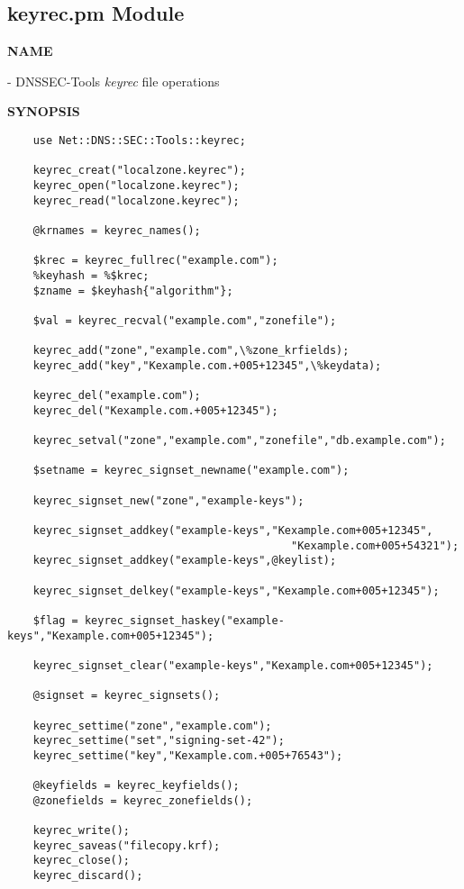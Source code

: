 \clearpage

\subsection{\bf keyrec.pm Module}

{\bf NAME}

 - DNSSEC-Tools {\it keyrec} file operations

{\bf SYNOPSIS}

\begin{verbatim}
    use Net::DNS::SEC::Tools::keyrec;

    keyrec_creat("localzone.keyrec");
    keyrec_open("localzone.keyrec");
    keyrec_read("localzone.keyrec");

    @krnames = keyrec_names();

    $krec = keyrec_fullrec("example.com");
    %keyhash = %$krec;
    $zname = $keyhash{"algorithm"};

    $val = keyrec_recval("example.com","zonefile");

    keyrec_add("zone","example.com",\%zone_krfields);
    keyrec_add("key","Kexample.com.+005+12345",\%keydata);

    keyrec_del("example.com");
    keyrec_del("Kexample.com.+005+12345");

    keyrec_setval("zone","example.com","zonefile","db.example.com");

    $setname = keyrec_signset_newname("example.com");

    keyrec_signset_new("zone","example-keys");

    keyrec_signset_addkey("example-keys","Kexample.com+005+12345",
                                            "Kexample.com+005+54321");
    keyrec_signset_addkey("example-keys",@keylist);

    keyrec_signset_delkey("example-keys","Kexample.com+005+12345");

    $flag = keyrec_signset_haskey("example-keys","Kexample.com+005+12345");

    keyrec_signset_clear("example-keys","Kexample.com+005+12345");

    @signset = keyrec_signsets();

    keyrec_settime("zone","example.com");
    keyrec_settime("set","signing-set-42");
    keyrec_settime("key","Kexample.com.+005+76543");

    @keyfields = keyrec_keyfields();
    @zonefields = keyrec_zonefields();

    keyrec_write();
    keyrec_saveas("filecopy.krf);
    keyrec_close();
    keyrec_discard();
\end{verbatim}

